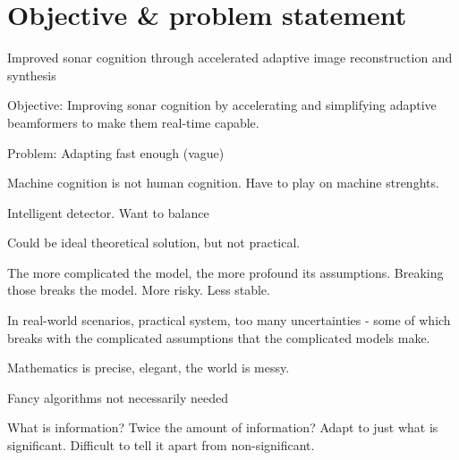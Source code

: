 \section{Objective \& problem statement}




Improved sonar cognition through accelerated adaptive image reconstruction and synthesis

Objective: Improving sonar cognition by accelerating and simplifying adaptive beamformers to make them real-time capable.

Problem: Adapting fast enough (vague)

Machine cognition is not human cognition. Have to play on machine strenghts. 


Intelligent detector. Want to balance 

Could be ideal theoretical solution, but not practical. 

The more complicated the model, the more profound its assumptions. Breaking those breaks the model. More risky. Less stable. 

In real-world scenarios, practical system, too many uncertainties - some of which breaks with the complicated assumptions that the complicated models make. 

Mathematics is precise, elegant, the world is messy. 

Fancy algorithms not necessarily needed

What is information? Twice the amount of information? Adapt to just what is significant. Difficult to tell it apart from non-significant. 

%
%

